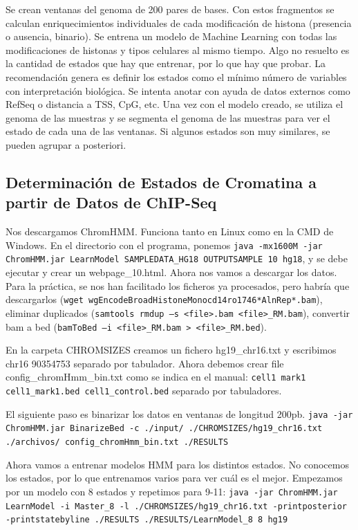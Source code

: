 Se crean ventanas del genoma de 200 pares de bases. Con estos fragmentos se calculan enriquecimientos individuales de cada modificación de histona (presencia o ausencia, binario). Se entrena un modelo de Machine Learning con todas las modificaciones de histonas y tipos celulares al mismo tiempo. Algo no resuelto es la cantidad de estados que hay que entrenar, por lo que hay que probar. La recomendación genera es definir los estados como el mínimo número de variables con interpretación biológica. Se intenta anotar con ayuda de datos externos como RefSeq o distancia a TSS, CpG, etc. Una vez con el modelo creado, se utiliza el genoma de las muestras y se segmenta el genoma de las muestras para ver el estado de cada una de las ventanas. Si algunos estados son muy similares, se pueden agrupar a posteriori. 

\subsection{Determinación de Estados de Cromatina a partir de Datos de ChIP-Seq}
Nos descargamos ChromHMM. Funciona tanto en Linux como en la CMD de Windows. En el directorio con el programa, ponemos \texttt{java -mx1600M -jar ChromHMM.jar LearnModel SAMPLEDATA\_HG18 OUTPUTSAMPLE 10 hg18}, y se debe ejecutar y crear un webpage\_10.html. Ahora nos vamos a descargar los datos. Para la práctica, se nos han facilitado los ficheros ya procesados, pero habría que descargarlos (\texttt{wget wgEncodeBroadHistoneMonocd14ro1746*AlnRep*.bam}), eliminar duplicados (\texttt{samtools rmdup –s <file>.bam <file>\_RM.bam}), convertir bam a bed (\texttt{bamToBed –i <file>\_RM.bam > <file>\_RM.bed}). 

En la carpeta CHROMSIZES creamos un fichero hg19\_chr16.txt y escribimos chr16 90354753 separado por tabulador. Ahora debemos crear file config\_chromHmm\_bin.txt como se indica en el manual:
\texttt{cell1 mark1 cell1\_mark1.bed cell1\_control.bed} separado por tabuladores.

El siguiente paso es binarizar los datos en ventanas de longitud 200pb. 
\texttt{java -jar ChromHMM.jar BinarizeBed -c ./input/
./CHROMSIZES/hg19\_chr16.txt ./archivos/
config\_chromHmm\_bin.txt ./RESULTS}

Ahora vamos a entrenar modelos HMM para los distintos estados. No conocemos los estados, por lo que entrenamos varios para ver cuál es el mejor. Empezamos por un modelo con 8 estados y repetimos para 9-11:
\texttt{java -jar ChromHMM.jar LearnModel -i Master\_8 -l ./CHROMSIZES/hg19\_chr16.txt -printposterior -printstatebyline ./RESULTS ./RESULTS/LearnModel\_8 8 hg19}

